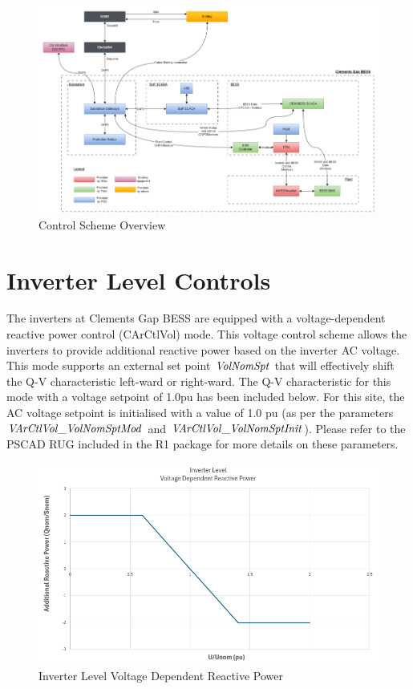 \documentclass{../grid-link-report}
\begin{document}
	\begin{figure}[H]
		\centering
		\includegraphics[width=1.0\linewidth]{report-assets/control-flow-overview.png}
		\caption{Control Scheme Overview}
		\label{fig:control-scheme-flow}
	\end{figure}	
	
	
	\chapter{Inverter Level Controls}
	The inverters at Clements Gap BESS are equipped with a voltage-dependent reactive power control (CArCtlVol) mode. This voltage control scheme allows the inverters to provide additional reactive power based on the inverter AC voltage. This mode supports an external set point $\it{VolNomSpt}$ that will effectively shift the Q-V characteristic left-ward or right-ward. The Q-V characteristic for this mode with a voltage setpoint of 1.0pu has been included below. For this site, the AC voltage setpoint is initialised with a value of 1.0 pu (as per the parameters $\it{VArCtlVol\_VolNomSptMod}$ and $\it{VArCtlVol\_VolNomSptInit}$). Please refer to the PSCAD RUG included in the R1 package for more details on these parameters. 
	
	
	\begin{figure}[H]
		\centering
		\includegraphics[width=1.0\linewidth]{report-assets/inverter-level-voltage-control_char.png}
		\caption{Inverter Level Voltage Dependent Reactive Power}
		\label{fig:inverter-level-voltage-control_char}
	\end{figure}		
	
\end{document}

